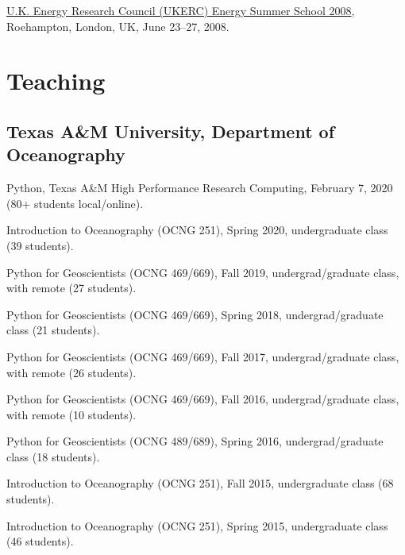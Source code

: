 \documentclass[10pt,letterpaper]{article}
\renewenvironment{itemize}{
  \begin{list}{}{
    \setlength{\leftmargin}{1.5em}
    \setlength{\itemsep}{0.25em}
    \setlength{\parskip}{0pt}
    \setlength{\parsep}{0.25em}
  }
}{
  \end{list}
}
\begin{document}
\begin{itemize}


\item \href{http://www.ukerc.ac.uk/support/tiki-index.php?page=0608UKERCSummerSchool}{U.K. Energy Research Council (UKERC) Energy Summer School 2008},
  Roehampton, London, UK,
  June 23--27, 2008.

\end{itemize}

\section*{Teaching}

\subsection*{Texas A\&M University, Department of Oceanography}

\begin{itemize}
\item Python, Texas A\&M High Performance Research Computing, February 7, 2020 (80+ students local/online).
\item Introduction to Oceanography (OCNG 251), Spring 2020, undergraduate class (39 students).
\item Python for Geoscientists (OCNG 469/669), Fall 2019, undergrad/graduate class, with remote (27 students).
\item Python for Geoscientists (OCNG 469/669), Spring 2018, undergrad/graduate class (21 students).
\item Python for Geoscientists (OCNG 469/669), Fall 2017, undergrad/graduate class, with remote (26 students).
\item Python for Geoscientists (OCNG 469/669), Fall 2016, undergrad/graduate class, with remote (10 students).
\item Python for Geoscientists (OCNG 489/689), Spring 2016, undergrad/graduate class (18 students).
\item Introduction to Oceanography (OCNG 251), Fall 2015, undergraduate class (68 students).
\item Introduction to Oceanography (OCNG 251), Spring 2015, undergraduate class (46 students).

\end{itemize}
\end{document}
